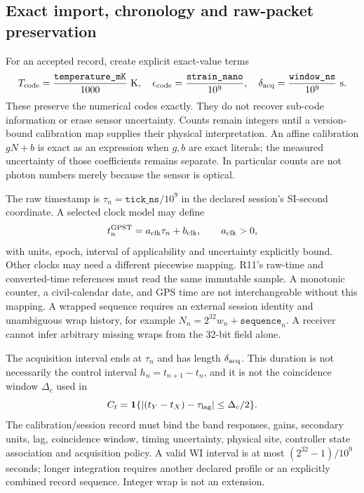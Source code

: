 \subsection{Exact import, chronology and raw-packet preservation}
For an accepted record, create explicit exact-value terms
\begin{equation}
 T_{\rm code}=\frac{\texttt{temperature\_mK}}{1000}\ \mathrm K,
 \quad\epsilon_{\rm code}=\frac{\texttt{strain\_nano}}{10^9},
 \quad\delta_{\rm acq}=\frac{\texttt{window\_ns}}{10^9}\ \mathrm s.
\end{equation}
These preserve the numerical codes exactly. They do not recover sub-code
information or erase sensor uncertainty. Counts remain integers until a
version-bound calibration map supplies their physical interpretation. An
affine calibration $gN+b$ is exact as an expression when $g,b$ are exact
literals; the measured uncertainty of those coefficients remains separate.
In particular counts are not photon numbers merely because the sensor is optical.

The raw timestamp is $\tau_n=\texttt{tick\_ns}/10^9$ in the declared session's
SI-second coordinate. A selected clock model may define
\begin{equation}
 t_n^{\rm GPST}=a_{\rm clk}\tau_n+b_{\rm clk},\qquad a_{\rm clk}>0,
\end{equation}
with units, epoch, interval of applicability and uncertainty explicitly bound.
Other clocks may need a different piecewise mapping. R11's raw-time and
converted-time references must read the same immutable sample. A monotonic
counter, a civil-calendar date, and GPS time are not interchangeable without
this mapping. A wrapped sequence requires an external session identity and
unambiguous wrap history, for example $N_n=2^{32}w_n+\texttt{sequence}_n$.
A receiver cannot infer arbitrary missing wraps from the 32-bit field alone.

The acquisition interval ends at $\tau_n$ and has length $\delta_{\rm acq}$.
This duration is not necessarily the control interval $h_n=t_{n+1}-t_n$,
and it is not the coincidence window $\Delta_c$ used in
\[
 C_t=\boldsymbol1\{|(t_Y-t_X)-\tau_{\rm lag}|\le\Delta_c/2\}.
\]
The calibration/session record must bind the band responses, gains, secondary
units, lag, coincidence window, timing uncertainty, physical site, controller
state association and acquisition policy. A valid WI interval is at most
$(2^{32}-1)/10^9$ seconds; longer integration requires another declared profile
or an explicitly combined record sequence. Integer wrap is not an extension.

